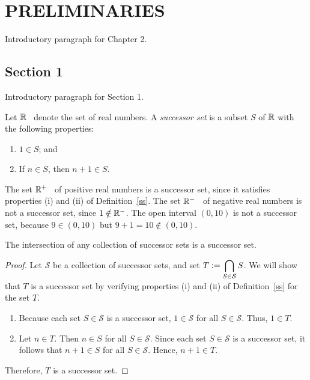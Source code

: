\chapter{PRELIMINARIES}

Introductory paragraph for Chapter 2.

\section{Section 1}

Introductory paragraph for Section 1. 

\begin{defn}\label{ss}
	\parencite{BkEx} Let $\mathbb{R}$~\label{real} denote the set of real numbers. A \textit{successor set} is a subset $S$ of $\mathbb{R}$ with the following properties:
	\begin{enumerate}
		\item[(i)] $1\in S$; and
		\item[(ii)] If $n\in S$, then $n+1\in S$.
	\end{enumerate}
\end{defn}

\begin{ex}
	The set $\mathbb{R}^+$~\label{preal} of positive real numbers is a successor set, since it satisfies properties (i) and (ii) of Definition~\ref{ss}. The set $\mathbb{R}^-$~\label{nreal} of negative real numbers is not a successor set, since $1\notin\mathbb{R}^-$. The open interval $(0,10)$ is not a successor set, because $9\in(0,10)$ but $9+1=10\notin(0,10)$.
\end{ex}

\begin{prop}\label{ints}
	The intersection of any collection of successor sets is a successor set.
\end{prop}

\begin{proof}
	Let $\mathcal{S}$ be a collection of successor sets, and set $T:=\displaystyle\bigcap_{S\in\mathcal{S}} S$. We will show that $T$ is a successor set by verifying properties (i) and (ii) of Definition~\ref{ss} for the set $T$.
	\begin{enumerate}
		\item[(i)] Because each set $S\in\mathcal{S}$ is a successor set, $1\in\mathcal{S}$ for all $S\in\mathcal{S}$. Thus, $1\in T$.
		\item[(ii)] Let $n\in T$. Then $n\in S$ for all $S\in\mathcal{S}$. Since each set $S\in\mathcal{S}$ is a successor set, it follows that $n+1\in S$ for all $S\in\mathcal{S}$. Hence, $n+1\in T$.
	\end{enumerate}
	Therefore, $T$ is a successor set.
\end{proof}

